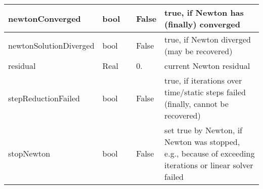 \begin{center}
\begin{longtable}{| p{4.2cm} | p{2.5cm} | p{0.3cm} | p{3.0cm} | p{6cm} |}
    newtonConverged &     bool &      &     False &     true, if Newton has (finally) converged\\ \hline
    newtonSolutionDiverged &     bool &      &     False &     true, if Newton diverged (may be recovered)\\ \hline
    residual &     Real &      &     0. &     current Newton residual\\ \hline
    stepReductionFailed &     bool &      &     False &     true, if iterations over time/static steps failed (finally, cannot be recovered)\\ \hline
    stopNewton &     bool &      &     False &     set true by Newton, if Newton was stopped, e.g., because of exceeding iterations or linear solver failed\\ \hline
	  \end{longtable}
	\end{center}

